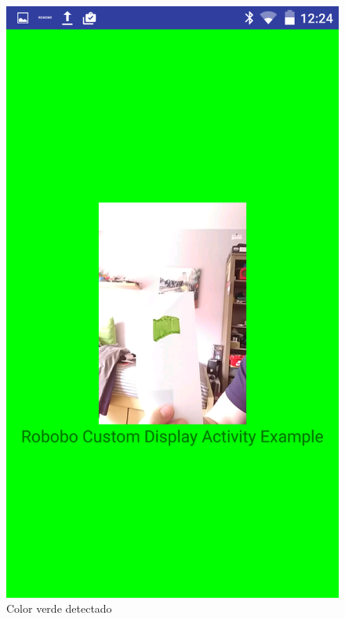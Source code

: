 \begin{figure}
\begin{minipage}{0.45\textwidth}
\end{minipage}\hfill
\begin{minipage}{0.45\textwidth}
\centering
\includegraphics[width=1\linewidth]{imagenes/color_detection_green.png}

\caption{Color verde detectado}
\label{fig:green_color}

\end{minipage}
\end{figure}

